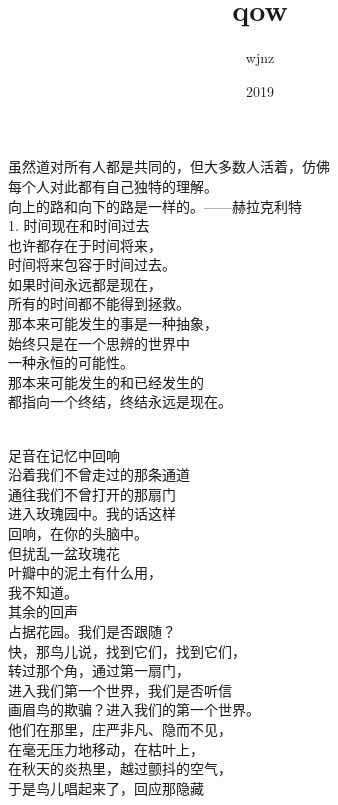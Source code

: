 \documentclass{article}
\title{qow}
\author{wjnz}
\date{2019}
\begin{document}

\maketitle

\setlength\parindent{0pt}


\Large

﻿虽然道对所有人都是共同的，但大多数人活着，仿佛\\
每个人对此都有自己独特的理解。\\
向上的路和向下的路是一样的。——赫拉克利特
\\
1. 时间现在和时间过去\\
也许都存在于时间将来，\\
时间将来包容于时间过去。\\
如果时间永远都是现在，\\
所有的时间都不能得到拯救。\\
那本来可能发生的事是一种抽象，\\
始终只是在一个思辨的世界中\\
一种永恒的可能性。\\
那本来可能发生的和已经发生的\\
都指向一个终结，终结永远是现在。 \par \newpage  \par 
\\
足音在记忆中回响\\
沿着我们不曾走过的那条通道\\
通往我们不曾打开的那扇门\\
进入玫瑰园中。我的话这样\\
回响，在你的头脑中。\\
但扰乱一盆玫瑰花\\
叶瓣中的泥土有什么用，\\
我不知道。\\
其余的回声\\
占据花园。我们是否跟随？\\
快，那鸟儿说，找到它们，找到它们，\\
转过那个角，通过第一扇门，\\
进入我们第一个世界，我们是否听信\\
画眉鸟的欺骗？进入我们的第一个世界。\\
他们在那里，庄严非凡、隐而不见，\\
在毫无压力地移动，在枯叶上，\\
在秋天的炎热里，越过颤抖的空气，\\
于是鸟儿唱起来了，回应那隐藏\\
\end{document}
